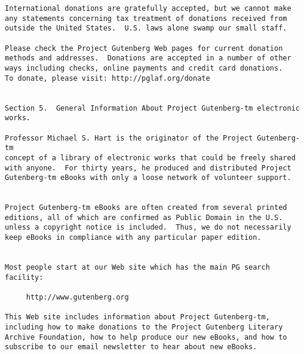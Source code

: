 \documentclass[12pt,oneside]{book}
\begin{document}
\begin{verbatim}
International donations are gratefully accepted, but we cannot make
any statements concerning tax treatment of donations received from
outside the United States.  U.S. laws alone swamp our small staff.

Please check the Project Gutenberg Web pages for current donation
methods and addresses.  Donations are accepted in a number of other
ways including checks, online payments and credit card donations.
To donate, please visit: http://pglaf.org/donate


Section 5.  General Information About Project Gutenberg-tm electronic
works.

Professor Michael S. Hart is the originator of the Project Gutenberg-tm
concept of a library of electronic works that could be freely shared
with anyone.  For thirty years, he produced and distributed Project
Gutenberg-tm eBooks with only a loose network of volunteer support.


Project Gutenberg-tm eBooks are often created from several printed
editions, all of which are confirmed as Public Domain in the U.S.
unless a copyright notice is included.  Thus, we do not necessarily
keep eBooks in compliance with any particular paper edition.


Most people start at our Web site which has the main PG search facility:

     http://www.gutenberg.org

This Web site includes information about Project Gutenberg-tm,
including how to make donations to the Project Gutenberg Literary
Archive Foundation, how to help produce our new eBooks, and how to
subscribe to our email newsletter to hear about new eBooks.
\end{verbatim}

\end{document}
